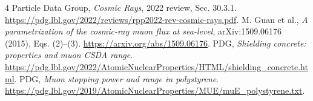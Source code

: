 \documentclass[10pt,letterpaper]{article}
\begin{document}
\begin{thebibliography}{4}\small\setlength{\itemsep}{0pt}
 Particle Data Group, \emph{Cosmic Rays}, 2022 review, Sec. 30.3.1.
\url{https://pdg.lbl.gov/2022/reviews/rpp2022-rev-cosmic-rays.pdf}.
 M. Guan et al., \emph{A parametrization of the cosmic-ray muon flux at sea-level}, arXiv:1509.06176 (2015), Eqs. (2)--(3). \url{https://arxiv.org/abs/1509.06176}.
 PDG, \emph{Shielding concrete: properties and muon CSDA range}.
\url{https://pdg.lbl.gov/2022/AtomicNuclearProperties/HTML/shielding_concrete.html}.
 PDG, \emph{Muon stopping power and range in polystyrene}.
\url{https://pdg.lbl.gov/2019/AtomicNuclearProperties/MUE/muE_polystyrene.txt}.
\end{thebibliography}
\end{document}
